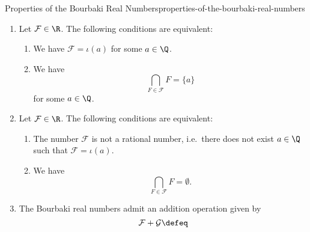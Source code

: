 \begin{proposition}{Properties of the Bourbaki Real Numbers}{properties-of-the-bourbaki-real-numbers}
\begin{enumerate}
\begin{enumerate}
                    \[
                        \iota(x)\leq_{\R}\iota(y)%
                    \]%
                    for each $x,y\in\Q$ with $x\leq y$.
            \end{enumerate}
        \item\label{properties-of-the-bourbaki-real-numbers-identifying-rational-numbers-inside-the-bourbaki-real-numbers}Let $\mathcal{F}\in\R$. The following conditions are equivalent:
            \begin{enumerate}
                \item\label{properties-of-the-bourbaki-real-numbers-identifying-rational-numbers-inside-the-bourbaki-real-numbers-1}We have $\mathcal{F}=\iota(a)$ for some $a\in\Q$.
                \item\label{properties-of-the-bourbaki-real-numbers-identifying-rational-numbers-inside-the-bourbaki-real-numbers-2}We have
                    \[
                        \bigcap_{F\in\mathcal{F}}F%
                        =%
                        \{a\}%
                    \]%
                    for some $a\in\Q$.
            \end{enumerate}
        \item\label{properties-of-the-bourbaki-real-numbers-identifying-irrational-numbers-inside-the-bourbaki-real-numbers}Let $\mathcal{F}\in\R$. The following conditions are equivalent:
            \begin{enumerate}
                \item\label{properties-of-the-bourbaki-real-numbers-identifying-irrational-numbers-inside-the-bourbaki-real-numbers-1}The number $\mathcal{F}$ is not a rational number, i.e.\ there does not exist $a\in\Q$ such that $\mathcal{F}=\iota(a)$.
                \item\label{properties-of-the-bourbaki-real-numbers-identifying-irrational-numbers-inside-the-bourbaki-real-numbers-2}We have
                    \[
                        \bigcap_{F\in\mathcal{F}}F%
                        =%
                        \emptyset.%
                    \]%
            \end{enumerate}
        \item\label{properties-of-the-bourbaki-real-numbers-addition}The Bourbaki real numbers admit an addition operation given by
            \[
                \mathcal{F}+\mathcal{G}%
                \defeq
\]
\end{enumerate}
\end{proposition}
